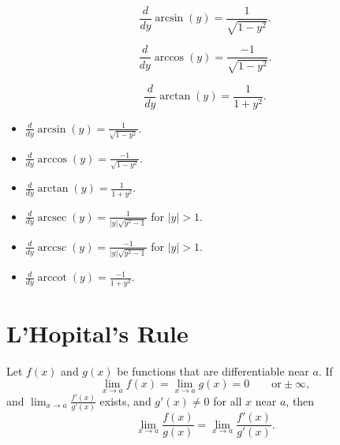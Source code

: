 \documentclass{ximera}
\newcommand{\dd}[2][]{\frac{d #1}{d #2}}
\DeclareMathOperator{\arccot}{arccot}
\DeclareMathOperator{\arcsec}{arcsec}
\DeclareMathOperator{\arccsc}{arccsc}
\begin{document}
\begin{theorem}
\[
\dd{y} \arcsin(y) = \frac{1}{\sqrt{1-y^2}}.
\]
\end{theorem}



\begin{theorem}
\[
\dd{y} \arccos(y) = \frac{-1}{\sqrt{1-y^2}}.
\]
\end{theorem}



\begin{theorem}
\[
\dd{y} \arctan(y) = \frac{1}{1+y^2}.
\]
\end{theorem}



\begin{theorem} \hfil
\begin{itemize}
\item $\dd{y} \arcsin(y) = \frac{1}{\sqrt{1-y^2}}$.
\item $\dd{y} \arccos(y) = \frac{-1}{\sqrt{1-y^2}}$.
\item $\dd{y} \arctan(y) = \frac{1}{1+y^2}$.
\item $\dd{y} \arcsec(y) = \frac{1}{|y|\sqrt{y^2-1}}$ for $|y|>1$.
\item $\dd{y} \arccsc(y) = \frac{-1}{|y|\sqrt{y^2-1}}$ for $|y|>1$.
\item $\dd{y} \arccot(y) = \frac{-1}{1+y^2}$.
\end{itemize}
\end{theorem}







\section*{L'Hopital's Rule}





\begin{theorem}
Let $f(x)$ and $g(x)$ be functions that are differentiable near $a$. If
\[
\lim_{x \to a} f(x) = \lim_{x \to a}g(x) = 0 \qquad \text{or} \pm \infty,
\]
and $\lim_{x \to a} \frac{f'(x)}{g'(x)}$ exists, and $g'(x) \neq 0$
for all $x$ near $a$, then
\[
\lim_{x \to a} \frac{f(x)}{g(x)} = \lim_{x \to a} \frac{f'(x)}{g'(x)}.
\]
\end{theorem}
\end{document}
